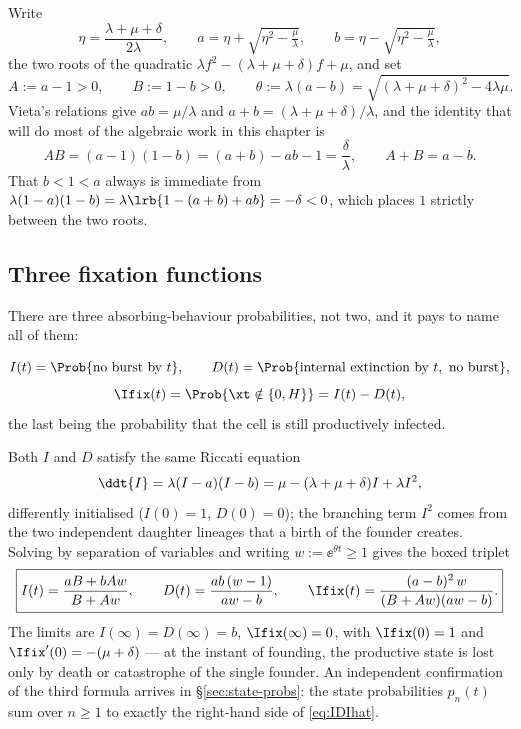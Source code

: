 Write
\begin{equation}
\eta=\frac{\lambda+\mu+\delta}{2\lambda},\qquad
a=\eta+\sqrt{\eta^2-\tfrac{\mu}{\lambda}},\qquad
b=\eta-\sqrt{\eta^2-\tfrac{\mu}{\lambda}},
\end{equation}
the two roots of the quadratic $\lambda f^2-(\lambda+\mu+\delta)f+\mu$, and
set
\begin{equation}
A:=a-1>0,\qquad B:=1-b>0,\qquad \theta:=\lambda(a-b)
=\sqrt{(\lambda+\mu+\delta)^2-4\lambda\mu}.
\end{equation}
Vieta's relations give $ab=\mu/\lambda$ and
$a+b=(\lambda+\mu+\delta)/\lambda$, and the identity that will do most of
the algebraic work in this chapter is
\begin{equation}
AB=(a-1)(1-b)=(a+b)-ab-1=\frac{\delta}{\lambda},
\qquad A+B=a-b.
\label{eq:AB}
\end{equation}
That $b<1<a$ always is immediate from
$\lambda(1-a)(1-b)=\lambda\lrb{1-(a+b)+ab}=-\delta<0$, which places $1$
strictly between the two roots.

\subsection{Three fixation functions}
\label{sec:fixation-funcs}

There are three absorbing-behaviour probabilities, not two, and it pays to
name all of them:
\begin{definition}
\begin{equation}
I(t)=\Prob{\text{no burst by }t},\qquad
D(t)=\Prob{\text{internal extinction by }t,\ \text{no burst}},
\end{equation}
\begin{equation}
\Ifix(t)=\Prob{\xt\notin\{0,H\}}=I(t)-D(t),
\end{equation}
the last being the probability that the cell is still productively infected.
\end{definition}

Both $I$ and $D$ satisfy the same Riccati equation
\begin{equation}
\ddt{I}=\lambda(I-a)(I-b)=\mu-(\lambda+\mu+\delta)I+\lambda I^2,
\label{eq:riccati}
\end{equation}
differently initialised ($I(0)=1$, $D(0)=0$); the branching term $I^2$ comes
from the two independent daughter lineages that a birth of the founder
creates. Solving by separation of variables and writing
$w:=\ee^{\theta t}\ge1$ gives the boxed triplet
\begin{equation}
\boxed{I(t)=\frac{aB+bAw}{B+Aw},\qquad
D(t)=\frac{ab\,(w-1)}{aw-b},\qquad
\Ifix(t)=\frac{(a-b)^2\,w}{(B+Aw)(aw-b)}.}
\label{eq:IDIhat}
\end{equation}
The limits are $I(\infty)=D(\infty)=b$, $\Ifix(\infty)=0$, with
$\Ifix(0)=1$ and $\Ifix'(0)=-(\mu+\delta)$ --- at the instant of founding,
the productive state is lost only by death or catastrophe of the single
founder. An independent confirmation of the third formula arrives in
\S\ref{sec:state-probs}: the state probabilities $p_n(t)$ sum over $n\ge1$
to exactly the right-hand side of \eqref{eq:IDIhat}.


